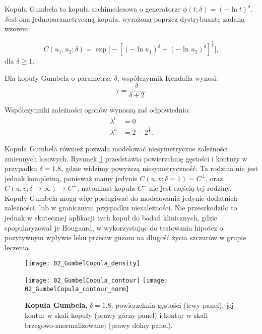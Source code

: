 \begin{df}
	Kopuła Gumbela to kopuła archimedesowa o generatorze $\phi(t;\delta) = (-\ln t)^{\delta}$. Jest ona jednoparametryczną kopuła, wyrażoną poprzez dystrybuantę zadaną wzorem:
	
	$$ C(u_1, u_2; \delta) = \exp\big[-[(-\ln u_1)^\delta+(-\ln u_2)^\delta]^{\frac{1}{\delta}}\big],$$
	dla $\delta \geqslant 1.$
\end{df}
\begin{prop}
	Dla kopuły Gumbela o parametrze $\delta$, współczynnik Kendalla wynosi:
	$$ \tau = \frac{\delta}{\delta + 2}.$$
	
	Współczynniki zależności ogonów wynoszą zaś odpowiednio:
	\begin{equation}
		\begin{split}
			\lambda^{l}&=0\\
			\lambda^{u}&=2 - 2^{\frac{1}{\delta}}.
		\end{split}
	\end{equation}
\end{prop}
Kopuła Gumbela również pozwala modelować niesymetryczne zależności zmiennych losowych.  Rysunek \ref{fig:gumbel_copula_density} przedstawia powierzchnię gęstości i kontury w przypadku $\delta = 1.8$, gdzie widzimy powyższą niesymetryczność. Ta rodzina nie jest jednak kompletną, ponieważ mamy jedynie $C(u,v;\delta = 1) = C^{\perp}$, oraz $C(u,v;\delta \to \infty) \to C^{+}$, natomiast kopuła $C^{-}$ nie jest częścią tej rodziny. \\
Kopuły Gumbela mogą więc posługiwać do modelowania jedynie dodatnich zależności, lub w granicznym przypadku niezależności. Nie przeszkodziło to jednak w skutecznej aplikacji tych kopuł do badań klinicznych, gdzie spopularyzował je Hougaard, w \cite{Hougaard1986} wykorzystując do testowania hipotez o pozytywnym wpływie leku przeciw guzom na długość życia szczurów w grupie leczenia.

\begin{figure}[h]
	\centering
	\begin{minipage}{0.5\linewidth}
		\texttt{[image: 02\_GumbelCopula\_density]}
	\end{minipage}
	\begin{minipage}{0.45\linewidth}
		\texttt{[image: 02\_GumbelCopula\_contour]}
		\texttt{[image: 02\_GumbelCopula\_contour\_norm]}
	\end{minipage}
	\caption{\textbf{Kopuła Gumbela}, $\delta = 1.8$: powierzchnia gęstości (lewy panel), jej kontur w skali kopuły (prawy górny panel) i kontur w skali brzegowo-znormalizowanej (prawy dolny panel). \label{fig:gumbel_copula_density}}
\end{figure}

